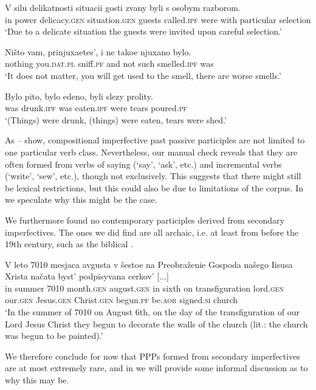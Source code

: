 \documentclass[output=paper,
modfonts,
newtxmath,
hidelinks
]{langscibook}
\begin{document}
\ea\gll	V silu delikatnosti situacii gosti zvany byli s osobym razborom. \label{zvany}\\
	in power delicacy.\textsc{gen} situation.\textsc{gen} guests called.\textsc{ipf} were with particular selection\\
\glt	`Due to a delicate situation the guests were invited upon careful selection.'
\z

\ea\gll	Ništo vam, prinjuxaetes', i ne takoe njuxano bylo. \label{njuxano}\\ 
	nothing you.\textsc{dat}.\textsc{pl} sniff.\textsc{pf} and not such smelled.\textsc{ipf} was\\
\glt	`It does not matter, you will get used to the smell, there are worse smells.'
\z

\ea\gll	Bylo pito, bylo edeno, byli slezy prolity. \label{pito}\\
	was drunk.\textsc{ipf} was eaten.\textsc{ipf} were tears poured.\textsc{pf}\\
\glt	`(Things) were drunk, (things) were eaten, tears were shed.'
\z

\noindent As -- show, compositional imperfective past passive participles are not limited to one particular verb class. Nevertheless, our manual check reveals that they are often formed from verbs of saying (`say', `ask', etc.) and incremental verbs (`write', `sew', etc.), though not exclusively. This suggests that there might still be lexical restrictions, but this could also be due to limitations of the corpus. In  we speculate why this might be the case. 

We furthermore found no contemporary participles derived from secondary imperfectives. The ones we did find are all archaic, i.e. at least from before the 19th century, such as the biblical . 

\ea\gll	V leto 7010 mesjaca avgusta v šestoe na Preobraženie Gospoda našego Iisusa Xrista načata byst' podpisyvana cerkov' [...] \label{7010} \\
	in summer 7010 month.\textsc{gen} august.\textsc{gen} in sixth on transfiguration lord.\textsc{gen} our.\textsc{gen} Jesus.\textsc{gen} Christ.\textsc{gen} begun.\textsc{pf} be.\textsc{aor} signed.\textsc{si} church \\ 
\glt    `In the summer of 7010 on August 6th, on the day of the transfiguration of our Lord Jesus Christ they begun to decorate the walls of the church (lit.: the church was begun to be painted).'
\z

\noindent We therefore conclude for now that PPPs formed from secondary imperfectives are at most extremely rare, and in  we will provide some informal discussion as to why this may be. 
\end{document}
